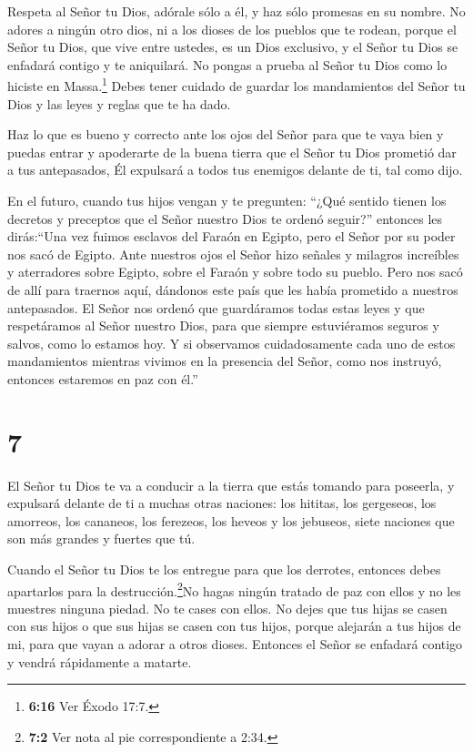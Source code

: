  Respeta al Señor tu Dios, adórale sólo a él, y haz sólo
promesas en su nombre.  No adores a ningún otro dios, ni a
los dioses de los pueblos que te rodean,  porque el Señor
tu Dios, que vive entre ustedes, es un Dios exclusivo, y el Señor tu
Dios se enfadará contigo y te aniquilará.  No pongas a
prueba al Señor tu Dios como lo hiciste en Massa.\footnote{\textbf{6:16}
  Ver Éxodo 17:7.}  Debes tener cuidado de guardar los
mandamientos del Señor tu Dios y las leyes y reglas que te ha dado.

 Haz lo que es bueno y correcto ante los ojos del Señor
para que te vaya bien y puedas entrar y apoderarte de la buena tierra
que el Señor tu Dios prometió dar a tus antepasados,  Él
expulsará a todos tus enemigos delante de ti, tal como dijo.

 En el futuro, cuando tus hijos vengan y te pregunten:
``¿Qué sentido tienen los decretos y preceptos que el Señor nuestro Dios
te ordenó seguir?''  entonces les dirás:``Una vez fuimos
esclavos del Faraón en Egipto, pero el Señor por su poder nos sacó de
Egipto.  Ante nuestros ojos el Señor hizo señales y
milagros increíbles y aterradores sobre Egipto, sobre el Faraón y sobre
todo su pueblo.  Pero nos sacó de allí para traernos aquí,
dándonos este país que les había prometido a nuestros antepasados.
 El Señor nos ordenó que guardáramos todas estas leyes y
que respetáramos al Señor nuestro Dios, para que siempre estuviéramos
seguros y salvos, como lo estamos hoy.  Y si observamos
cuidadosamente cada uno de estos mandamientos mientras vivimos en la
presencia del Señor, como nos instruyó, entonces estaremos en paz con
él.''

\hypertarget{section-6}{%
\section{7}\label{section-6}}

 El Señor tu Dios te va a conducir a la tierra que estás
tomando para poseerla, y expulsará delante de ti a muchas otras
naciones: los hititas, los gergeseos, los amorreos, los cananeos, los
ferezeos, los heveos y los jebuseos, siete naciones que son más grandes
y fuertes que tú.

 Cuando el Señor tu Dios te los entregue para que los
derrotes, entonces debes apartarlos para la destrucción.\footnote{\textbf{7:2}
  Ver nota al pie correspondiente a 2:34.}No hagas ningún tratado de paz
con ellos y no les muestres ninguna piedad.  No te cases con
ellos. No dejes que tus hijas se casen con sus hijos o que sus hijas se
casen con tus hijos,  porque alejarán a tus hijos de mi,
para que vayan a adorar a otros dioses. Entonces el Señor se enfadará
contigo y vendrá rápidamente a matarte.

